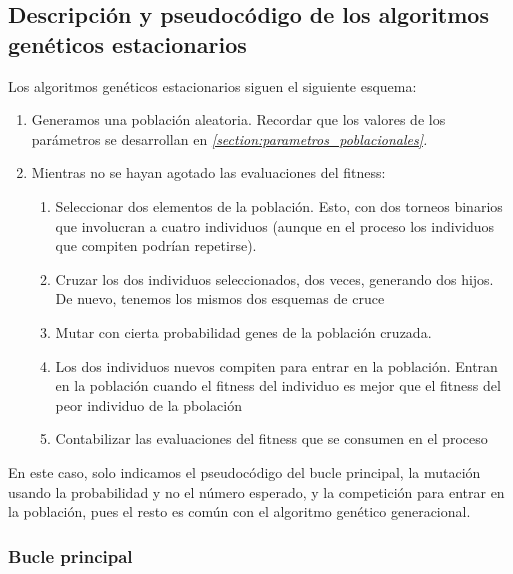 \documentclass[11pt]{article}
\begin{document}
\pagebreak

\subsection{Descripción y pseudocódigo de los algoritmos genéticos estacionarios}

Los algoritmos genéticos estacionarios siguen el siguiente esquema:

\begin{enumerate}
    \item Generamos una población aleatoria. Recordar que los valores de los parámetros se desarrollan en \emph{\ref{section:parametros_poblacionales}. }
    \item Mientras no se hayan agotado las evaluaciones del fitness:
        \begin{enumerate}
            \item Seleccionar dos elementos de la población. Esto, con dos torneos binarios que involucran a cuatro individuos (aunque en el proceso los individuos que compiten podrían repetirse).
            \item Cruzar los dos individuos seleccionados, dos veces, generando dos hijos. De nuevo, tenemos los mismos dos esquemas de cruce
            \item Mutar con cierta probabilidad genes de la población cruzada.
            \item Los dos individuos nuevos compiten para entrar en la población. Entran en la población cuando el fitness del individuo es mejor que el fitness del peor individuo de la pbolación
            \item Contabilizar las evaluaciones del fitness que se consumen en el proceso
    \end{enumerate}
\end{enumerate}

En este caso, solo indicamos el pseudocódigo del bucle principal, la mutación usando la probabilidad y no el número esperado, y la competición para entrar en la población, pues el resto es común con el algoritmo genético generacional.

\subsubsection{Bucle principal}
\end{document}
